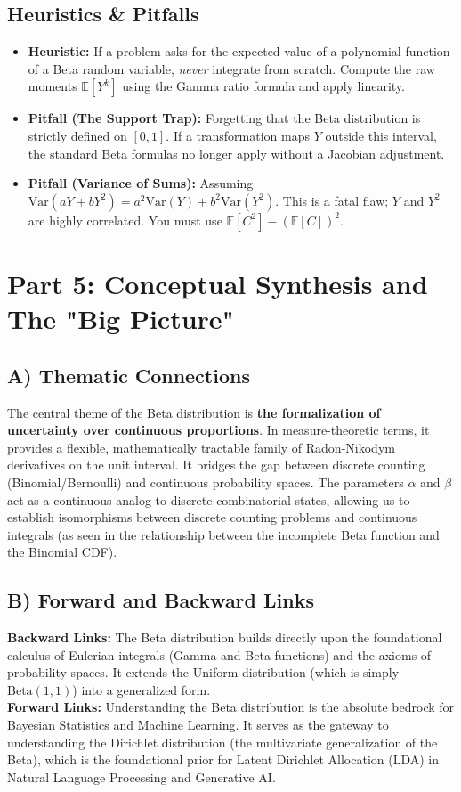 \documentclass[11pt, a4paper]{article}
\theoremstyle{definition}
\theoremstyle{remark}
\newcommand{\E}{\mathbb{E}}
\begin{document}
\subsection{Heuristics \& Pitfalls}
\begin{itemize}
    \item \textbf{Heuristic:} If a problem asks for the expected value of a polynomial function of a Beta random variable, \textit{never} integrate from scratch. Compute the raw moments $\E[Y^k]$ using the Gamma ratio formula and apply linearity.
    \item \textbf{Pitfall (The Support Trap):} Forgetting that the Beta distribution is strictly defined on $[0,1]$. If a transformation maps $Y$ outside this interval, the standard Beta formulas no longer apply without a Jacobian adjustment.
    \item \textbf{Pitfall (Variance of Sums):} Assuming $\text{Var}(aY + bY^2) = a^2\text{Var}(Y) + b^2\text{Var}(Y^2)$. This is a fatal flaw; $Y$ and $Y^2$ are highly correlated. You must use $\E[C^2] - (\E[C])^2$.
\end{itemize}

\newpage
\section{Part 5: Conceptual Synthesis and The "Big Picture"}

\subsection{A) Thematic Connections}
The central theme of the Beta distribution is \textbf{the formalization of uncertainty over continuous proportions}. In measure-theoretic terms, it provides a flexible, mathematically tractable family of Radon-Nikodym derivatives on the unit interval. It bridges the gap between discrete counting (Binomial/Bernoulli) and continuous probability spaces. The parameters $\alpha$ and $\beta$ act as a continuous analog to discrete combinatorial states, allowing us to establish isomorphisms between discrete counting problems and continuous integrals (as seen in the relationship between the incomplete Beta function and the Binomial CDF).

\subsection{B) Forward and Backward Links}
\textbf{Backward Links:} The Beta distribution builds directly upon the foundational calculus of Eulerian integrals (Gamma and Beta functions) and the axioms of probability spaces. It extends the Uniform distribution (which is simply $\text{Beta}(1,1)$) into a generalized form. \\
\textbf{Forward Links:} Understanding the Beta distribution is the absolute bedrock for Bayesian Statistics and Machine Learning. It serves as the gateway to understanding the Dirichlet distribution (the multivariate generalization of the Beta), which is the foundational prior for Latent Dirichlet Allocation (LDA) in Natural Language Processing and Generative AI.
\end{document}
